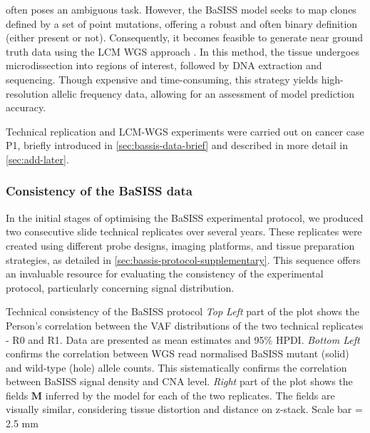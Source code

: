  often poses an ambiguous task. However, the BaSISS model seeks to map clones defined by a set of point mutations, offering a robust and often binary definition (either present or not). Consequently, it becomes feasible to generate near ground truth data using the \ac{LCM} \ac{WGS} approach \parencite{Shen2000-xj}. In this method, the tissue undergoes microdissection into regions of interest, followed by DNA extraction and sequencing. Though expensive and time-consuming, this strategy yields high-resolution allelic frequency data, allowing for an assessment of model prediction accuracy.

Technical replication and \ac{LCM}-\ac{WGS} experiments were carried out on cancer case P1, briefly introduced in \cref{sec:bassis-data-brief} and described in more detail in \cref{sec:add-later}.

\subsubsection*{Consistency of the BaSISS data}
In the initial stages of optimising the \ac{BaSISS} experimental protocol, we produced two consecutive slide technical replicates over several years. These replicates were created using different probe designs, imaging platforms, and tissue preparation strategies, as detailed in \cref{sec:bassis-protocol-supplementary}. This sequence offers an invaluable resource for evaluating the consistency of the experimental protocol, particularly concerning signal distribution.

    {Technical consistency of the \ac{BaSISS} protocol}
    {\emph{Top Left} part of the plot shows the Person's correlation between the \ac{VAF} distributions of the two technical replicates - R0 and R1. Data are presented as mean
    estimates and 95\% HPDI. \emph{Bottom Left} confirms the correlation between \ac{WGS} read normalised \ac{BaSISS} mutant (solid) and wild-type (hole) allele counts. This sistematically confirms the correlation between \ac{BaSISS} signal density and \ac{CNA} level. \emph{Right} part of the plot shows the fields $\mathbf{M}$ inferred by the model for each of the two replicates. The fields are visually similar, considering tissue distortion and distance on z-stack. Scale bar = 2.5 mm}

